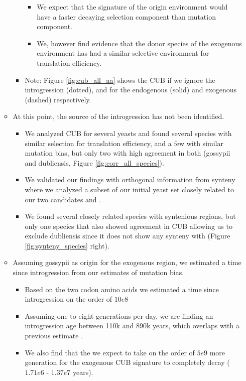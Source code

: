 \documentclass[12pt]{article}
\begin{document}
\begin{itemize}
\begin{itemize}
\begin{itemize}
			\begin{itemize}
				\item We expect that the signature of the origin environment would have a faster decaying selection component than mutation component.
				\item We, however find evidence that the donor species of the exogenous environment has had a similar selective environment for translation efficiency.
			\end{itemize}
			\item Note: Figure \ref{fig:cub_all_aa} shows the CUB if we ignore the introgression (dotted), and for the endogenous (solid) and exogenous (dashed) respectively.
		\end{itemize}
		\item At this point, the source of the introgression has not been identified.
		\begin{itemize}
			\item We analyzed CUB for several yeasts and found several species with similar selection for translation efficiency, and a few with similar mutation bias, but only two with high agreement in both (gossypii and dubliensis, Figure \ref{fig:corr_all_species}).
			\item We validated our findings with orthogonal information from synteny where we analyzed a subset of our initial yeast set closely related to our two candidates and \kluyveri.
			\item We found several closely related species with syntenious regions, but only one species that also showed agreement in CUB allowing us to exclude dubliensis since it does not show any synteny with \kluyveri (Figure \ref{fig:synteny_species} right).
		\end{itemize}
		\item Assuming gossypii as origin for the exogenous region, we estimated a time since introgression from our estimates of mutation bias.
		\begin{itemize}
			\item Based on the two codon amino acids we estimated a time since introgression on the order of $10e8$
			\item Assuming one to eight generations per day, we are finding an introgression age between 110k and 890k years, which overlaps with a previous estimate \citep{friedrich2015}.
			\item We also find that the we expect to take on the order of $5e9$ more generation for the exogenous CUB signature to completely decay ($1.71e6$ - $1.37e7$ years).  
		\end{itemize}
	\end{itemize}
\end{itemize}
\end{document}
